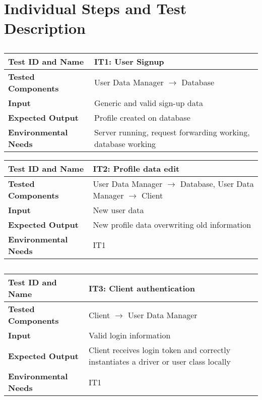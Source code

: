 \section{Individual Steps and Test Description}

\subsection{}

\begin{tabular}{l p{}}
    \hline
    \textbf{Test ID and Name} & IT1: User Signup\\
    \hline
    \textbf{Tested Components} & User Data Manager $\rightarrow$ Database\\
    \hline
    \textbf{Input} & Generic and valid sign-up data\\
    \hline
    \textbf{Expected Output} & Profile created on database\\
    \hline
    \textbf{Environmental Needs} & Server running, request forwarding working, database working\\
    \hline
\end{tabular}

\vspace{2em}

\noindent\begin{tabular}{l p{}}
    \hline
    \textbf{Test ID and Name} & IT2: Profile data edit\\
    \hline
    \textbf{Tested Components} & User Data Manager $\rightarrow$ Database, User Data Manager $\rightarrow$ Client\\
    \hline
    \textbf{Input} & New user data\\
    \hline
    \textbf{Expected Output} & New profile data overwriting old information\\
    \hline
    \textbf{Environmental Needs} & IT1\\
    \hline
\end{tabular}

\subsection{}

\begin{tabular}{l p{}}
    \hline
    \textbf{Test ID and Name} & IT3: Client authentication\\
    \hline
    \textbf{Tested Components} & Client $\rightarrow$ User Data Manager\\
    \hline
    \textbf{Input} & Valid login information\\
    \hline
    \textbf{Expected Output} & Client receives login token and correctly instantiates a driver or user class locally\\
    \hline
    \textbf{Environmental Needs} & IT1\\
    \hline
\end{tabular}

